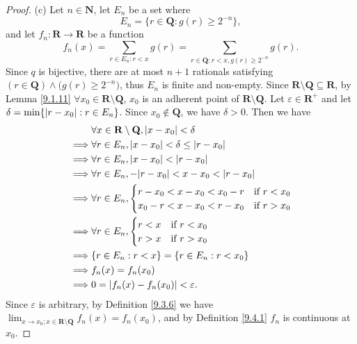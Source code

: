 \begin{proof}{(c)}
    Let \(n \in \mathbf{N}\), let \(E_n\) be a set where
    \[
        E_n = \{r \in \mathbf{Q} : g(r) \geq 2^{-n}\},
    \]
    and let \(f_n : \mathbf{R} \to \mathbf{R}\) be a function
    \[
        f_n(x) = \sum_{r \in E_n : r < x} g(r) = \sum_{r \in \mathbf{Q} : r < x, g(r) \geq 2^{-n}} g(r).
    \]
    Since \(q\) is bijective, there are at most \(n + 1\) rationals satisfying \((r \in \mathbf{Q}) \land \big(g(r) \geq 2^{-n}\big)\), thus \(E_n\) is finite and non-empty.
    Since \(\mathbf{R} \setminus \mathbf{Q} \subseteq \mathbf{R}\), by Lemma \ref{9.1.11} \(\forall x_0 \in \mathbf{R} \setminus \mathbf{Q}\), \(x_0\) is an adherent point of \(\mathbf{R} \setminus \mathbf{Q}\).
    Let \(\varepsilon \in \mathbf{R}^+\) and let \(\delta = \min\{\abs*{r - x_0} : r \in E_n\}\).
    Since \(x_0 \notin \mathbf{Q}\), we have \(\delta > 0\).
    Then we have
    \begin{align*}
                 & \forall x \in \mathbf{R} \setminus \mathbf{Q}, \abs*{x - x_0} < \delta \\
        \implies & \forall r \in E_n, \abs*{x - x_0} < \delta \leq \abs*{r - x_0}         \\
        \implies & \forall r \in E_n, \abs*{x - x_0} < \abs*{r - x_0}                     \\
        \implies & \forall r \in E_n, -\abs*{r - x_0} < x - x_0 < \abs*{r - x_0}          \\
        \implies & \forall r \in E_n, \begin{cases}
                                          r - x_0 < x - x_0 < x_0 - r & \text{if } r < x_0 \\
                                          x_0 - r < x - x_0 < r - x_0 & \text{if } r > x_0
                                      \end{cases}    \\
        \implies & \forall r \in E_n, \begin{cases}
                                          r < x & \text{if } r < x_0 \\
                                          r > x & \text{if } r > x_0
                                      \end{cases}                          \\
        \implies & \{r \in E_n : r < x\} = \{r \in E_n : r < x_0\}                        \\
        \implies & f_n(x) = f_n(x_0)                                                      \\
        \implies & 0 = \abs*{f_n(x) - f_n(x_0)} < \varepsilon.
    \end{align*}
    Since \(\varepsilon\) is arbitrary, by Definition \ref{9.3.6} we have \(\lim_{x \to x_0 ; x \in \mathbf{R} \setminus \mathbf{Q}} f_n(x) = f_n(x_0)\), and by Definition \ref{9.4.1} \(f_n\) is continuous at \(x_0\).


\end{proof}
